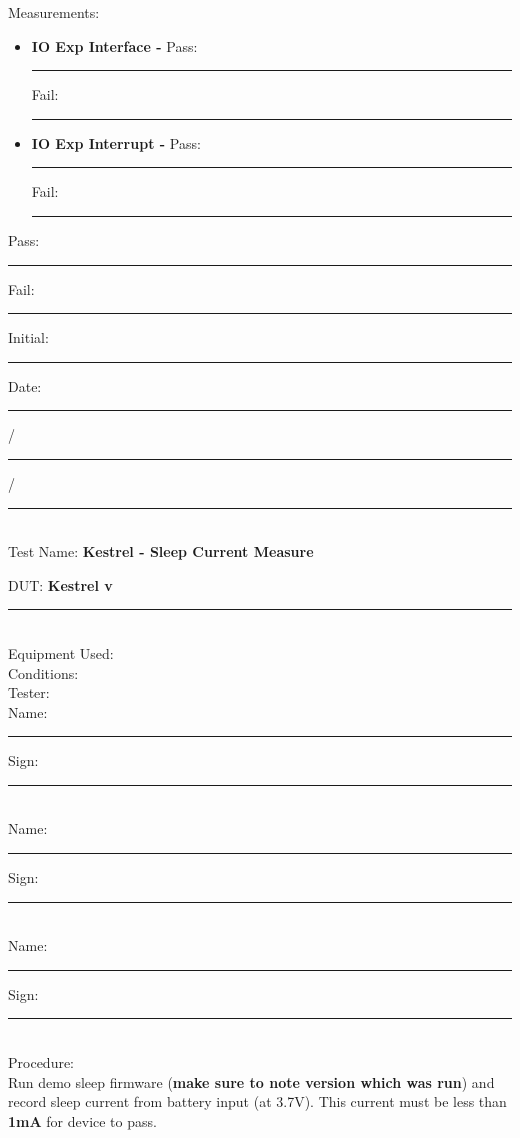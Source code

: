 {\Large Measurements: }\\
\begin{itemize}
\item \textbf{IO Exp Interface - } \hfill Pass: \rule{1cm}{0.15mm} \hspace{1cm} Fail: \rule{1cm}{0.15mm}
\item \textbf{IO Exp Interrupt - } \hfill Pass: \rule{1cm}{0.15mm} \hspace{1cm} Fail: \rule{1cm}{0.15mm}
\end{itemize}


\vfill
{\large Pass: \rule{1cm}{0.15mm} \hspace{1cm} Fail: \rule{1cm}{0.15mm}} \hfill Initial: \rule{2cm}{0.15mm} \hspace{1cm} Date: \rule{0.5cm}{0.15mm}/\rule{0.5cm}{0.15mm}/\rule{1cm}{0.15mm}\\[5pt]

\pagebreak
{\Huge Test Name: \textbf{Kestrel - Sleep Current Measure}}\\[20pt]
{\Large DUT: \textbf{Kestrel v}\rule{1cm}{0.15mm}} \\[10pt]
{\Large Equipment Used: }\\[40pt]
{\Large Conditions: }\\[40pt]
{\Large Tester: }\\[10pt]
Name: \rule{4cm}{0.15mm} \hfill Sign: \rule{4cm}{0.15mm}\\[5pt]
Name: \rule{4cm}{0.15mm} \hfill Sign: \rule{4cm}{0.15mm}\\[5pt]
Name: \rule{4cm}{0.15mm} \hfill Sign: \rule{4cm}{0.15mm}\\[15pt]
{\Large Procedure: }\\
Run demo sleep firmware (\textbf{make sure to note version which was run}) and record sleep current from battery input (at 3.7V). This current must be less than \textbf{1mA} for device to pass.

